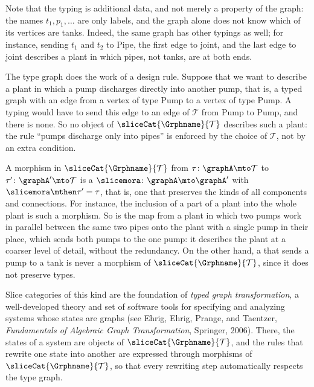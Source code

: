 \begin{example}
    Note that the typing is additional data, and not merely a property of the graph: the names $t_1, p_1, \dots$ are only labels, and the graph alone does not know which of its vertices are tanks.
    Indeed, the same graph has other typings as well; for instance, sending $t_1$ and $t_2$ to Pipe, the first edge to joint, and the last edge to joint describes a plant in which pipes, not tanks, are at both ends.

    The type graph does the work of a design rule.
    Suppose that we want to describe a plant in which a pump discharges directly into another pump, that is, a typed graph with an edge from a vertex of type Pump to a vertex of type Pump.
    A typing would have to send this edge to an edge of $\mathcal{T}$ from Pump to Pump, and there is none.
    So no object of $\sliceCat{\Grphname}{\mathcal{T}}$ describes such a plant: the rule ``pumps discharge only into pipes'' is enforced by the choice of $\mathcal{T}$, not by an extra condition.

    A morphism in $\sliceCat{\Grphname}{\mathcal{T}}$ from $\tau \colon \graphA \mto \mathcal{T}$ to $\tau' \colon \graphA' \mto \mathcal{T}$ is a  $\slicemora \colon \graphA \mto \graphA'$ with $\slicemora \mthen \tau' = \tau$, that is, one that preserves the kinds of all components and connections.
    For instance, the inclusion of a part of a plant into the whole plant is such a morphism.
    So is the map from a plant in which two pumps work in parallel between the same two pipes onto the plant with a single pump in their place, which sends both pumps to the one pump: it describes the plant at a coarser level of detail, without the redundancy.
    On the other hand, a  that sends a pump to a tank is never a morphism of $\sliceCat{\Grphname}{\mathcal{T}}$, since it does not preserve types.

    Slice categories of this kind are the foundation of \emph{typed graph transformation}, a well-developed theory and set of software tools for specifying and analyzing systems whose states are graphs (see Ehrig, Ehrig, Prange, and Taentzer, \emph{Fundamentals of Algebraic Graph Transformation}, Springer, 2006).
    There, the states of a system are objects of $\sliceCat{\Grphname}{\mathcal{T}}$, and the rules that rewrite one state into another are expressed through morphisms of $\sliceCat{\Grphname}{\mathcal{T}}$, so that every rewriting step automatically respects the type graph.
\end{example}

